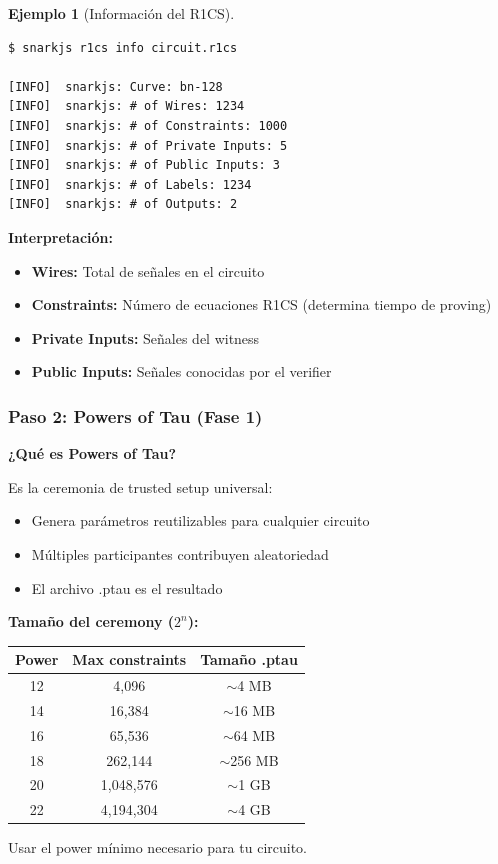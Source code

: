 \documentclass[11pt,a4paper,twoside,openright]{book}
\theoremstyle{definition}
\newtheorem{example}{Ejemplo}[chapter]
\theoremstyle{plain}
\theoremstyle{remark}
\begin{document}
\begin{example}[Información del R1CS]
\begin{verbatim}
$ snarkjs r1cs info circuit.r1cs

[INFO]  snarkjs: Curve: bn-128
[INFO]  snarkjs: # of Wires: 1234
[INFO]  snarkjs: # of Constraints: 1000
[INFO]  snarkjs: # of Private Inputs: 5
[INFO]  snarkjs: # of Public Inputs: 3
[INFO]  snarkjs: # of Labels: 1234
[INFO]  snarkjs: # of Outputs: 2
\end{verbatim}

\textbf{Interpretación:}
\begin{itemize}
    \item \textbf{Wires:} Total de señales en el circuito
    \item \textbf{Constraints:} Número de ecuaciones R1CS (determina tiempo de proving)
    \item \textbf{Private Inputs:} Señales del witness
    \item \textbf{Public Inputs:} Señales conocidas por el verifier
\end{itemize}
\end{example}

\subsubsection{Paso 2: Powers of Tau (Fase 1)}

\begin{keyidea}
\textbf{¿Qué es Powers of Tau?}

Es la ceremonia de trusted setup universal:
\begin{itemize}
    \item Genera parámetros reutilizables para cualquier circuito
    \item Múltiples participantes contribuyen aleatoriedad
    \item El archivo .ptau es el resultado
\end{itemize}

\textbf{Tamaño del ceremony ($2^n$):}
\begin{center}
\begin{tabular}{ccc}
\toprule
\textbf{Power} & \textbf{Max constraints} & \textbf{Tamaño .ptau} \\
\midrule
12 & 4,096 & $\sim$4 MB \\
14 & 16,384 & $\sim$16 MB \\
16 & 65,536 & $\sim$64 MB \\
18 & 262,144 & $\sim$256 MB \\
20 & 1,048,576 & $\sim$1 GB \\
22 & 4,194,304 & $\sim$4 GB \\
\bottomrule
\end{tabular}
\end{center}

Usar el power mínimo necesario para tu circuito.
\end{keyidea}
\end{document}

